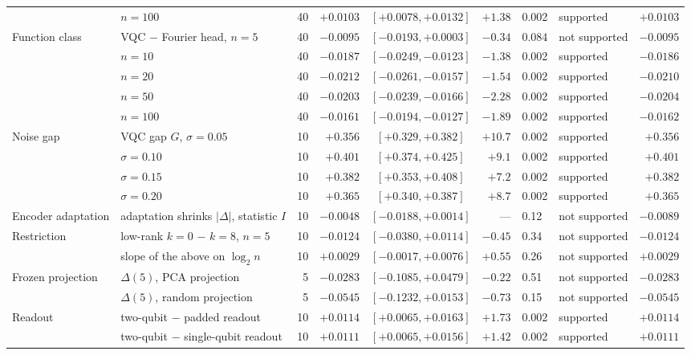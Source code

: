 \documentclass{ieeeaccess}
\newcommand{\vqc}{VQC}
\begin{document}
\begin{table}[t]
\begin{tabular}{@{}llrrcrllr@{}}
 & \quad $n=100$ & 40 & $+0.0103$ & $[+0.0078, +0.0132]$ & $+1.38$ & 0.002 & supported & $+0.0103$\\
Function class & \vqc{} $-$ Fourier head, $n=5$ & 40 & $-0.0095$ & $[-0.0193, +0.0003]$ & $-0.34$ & 0.084 & not supported & $-0.0095$\\
 & \quad $n=10$ & 40 & $-0.0187$ & $[-0.0249, -0.0123]$ & $-1.38$ & 0.002 & supported & $-0.0186$\\
 & \quad $n=20$ & 40 & $-0.0212$ & $[-0.0261, -0.0157]$ & $-1.54$ & 0.002 & supported & $-0.0210$\\
 & \quad $n=50$ & 40 & $-0.0203$ & $[-0.0239, -0.0166]$ & $-2.28$ & 0.002 & supported & $-0.0204$\\
 & \quad $n=100$ & 40 & $-0.0161$ & $[-0.0194, -0.0127]$ & $-1.89$ & 0.002 & supported & $-0.0162$\\
Noise gap & \vqc{} gap $G$, $\sigma=0.05$ & 10 & $+0.356$ & $[+0.329, +0.382]$ & $+10.7$ & 0.002 & supported & $+0.356$\\
 & \quad $\sigma=0.10$ & 10 & $+0.401$ & $[+0.374, +0.425]$ & $+9.1$ & 0.002 & supported & $+0.401$\\
 & \quad $\sigma=0.15$ & 10 & $+0.382$ & $[+0.353, +0.408]$ & $+7.2$ & 0.002 & supported & $+0.382$\\
 & \quad $\sigma=0.20$ & 10 & $+0.365$ & $[+0.340, +0.387]$ & $+8.7$ & 0.002 & supported & $+0.365$\\
Encoder adaptation & adaptation shrinks $|\Delta|$, statistic $I$ & 10 & $-0.0048$ & $[-0.0188, +0.0014]$ & --- & 0.12 & not supported & $-0.0089$\\
Restriction & low-rank $k{=}0$ $-$ $k{=}8$, $n=5$ & 10 & $-0.0124$ & $[-0.0380, +0.0114]$ & $-0.45$ & 0.34 & not supported & $-0.0124$\\
 & slope of the above on $\log_2 n$ & 10 & $+0.0029$ & $[-0.0017, +0.0076]$ & $+0.55$ & 0.26 & not supported & $+0.0029$\\
Frozen projection & $\Delta(5)$, PCA projection & 5 & $-0.0283$ & $[-0.1085, +0.0479]$ & $-0.22$ & 0.51 & not supported & $-0.0283$\\
 & $\Delta(5)$, random projection & 5 & $-0.0545$ & $[-0.1232, +0.0153]$ & $-0.73$ & 0.15 & not supported & $-0.0545$\\
Readout & two-qubit $-$ padded readout & 10 & $+0.0114$ & $[+0.0065, +0.0163]$ & $+1.73$ & 0.002 & supported & $+0.0114$\\
 & two-qubit $-$ single-qubit readout & 10 & $+0.0111$ & $[+0.0065, +0.0156]$ & $+1.42$ & 0.002 & supported & $+0.0111$\\
\bottomrule
\end{tabular}
\end{table}
\end{document}
